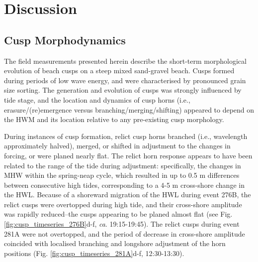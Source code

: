 	

\section{Discussion}\label{ch2:Discussion}

\subsection{Cusp Morphodynamics}\label{subsec:Morphodynamics}

The field measurements presented herein describe the short-term morphological evolution of beach cusps on a steep mixed sand-gravel beach. Cusps formed during periods of low wave energy, and were characterised by pronounced grain size sorting. The generation and evolution of cusps was strongly influenced by tide stage, and the location and dynamics of cusp horns (i.e., erasure/(re)emergence versus branching/merging/shifting) appeared to depend on the HWM and its location relative to any pre-existing cusp morphology. 

During instances of cusp formation, relict cusp horns branched (i.e., wavelength approximately halved), merged, or shifted in adjustment to the changes in forcing, or were planed nearly flat. The relict horn response appears to have been related to the range of the tide during adjustment: specifically, the changes in MHW within the spring-neap cycle, which resulted in up to 0.5 m differences between consecutive high tides, corresponding to a 4-5 m cross-shore change in the HWL. Because of a shoreward migration of the HWL during event 276B, the relict cusps were overtopped during high tide, and their cross-shore amplitude was rapidly reduced--the cusps appearing to be planed almost flat (see Fig. \ref{fig:cusp_timeseries_276B}d-f, \textit{ca}. 19:15-19:45). The relict cusps during event 281A were not overtopped, and the period of decrease in cross-shore amplitude coincided with localised branching and longshore adjustment of the horn positions (Fig. \ref{fig:cusp_timeseries_281A}d-f, 12:30-13:30). 

